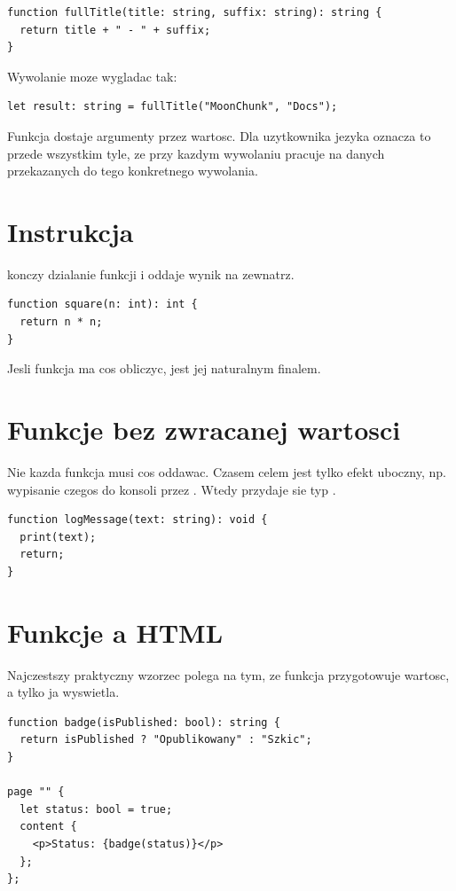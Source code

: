 \begin{lstlisting}[style=moonchunk,caption={Funkcja z dwoma parametrami}]
function fullTitle(title: string, suffix: string): string {
  return title + " - " + suffix;
}
\end{lstlisting}

Wywolanie moze wygladac tak:

\begin{lstlisting}[style=moonchunk,caption={Wywolanie funkcji}]
let result: string = fullTitle("MoonChunk", "Docs");
\end{lstlisting}

Funkcja dostaje argumenty przez wartosc. Dla uzytkownika jezyka oznacza to przede
wszystkim tyle, ze przy kazdym wywolaniu pracuje na danych przekazanych do tego
konkretnego wywolania.

\section{Instrukcja }
 konczy dzialanie funkcji i oddaje wynik na zewnatrz.

\begin{lstlisting}[style=moonchunk,caption={Zwracanie wyniku z funkcji}]
function square(n: int): int {
  return n * n;
}
\end{lstlisting}

Jesli funkcja ma cos obliczyc,  jest jej naturalnym finalem.

\section{Funkcje bez zwracanej wartosci}
Nie kazda funkcja musi cos oddawac. Czasem celem jest tylko efekt uboczny, np. wypisanie
czegos do konsoli przez . Wtedy przydaje sie typ .

\begin{lstlisting}[style=moonchunk,caption={Funkcja typu void}]
function logMessage(text: string): void {
  print(text);
  return;
}
\end{lstlisting}

\section{Funkcje a HTML}
Najczestszy praktyczny wzorzec polega na tym, ze funkcja przygotowuje wartosc,
a  tylko ja wyswietla.

\begin{lstlisting}[style=moonchunk,caption={Funkcja przygotowujaca tekst do strony}]
function badge(isPublished: bool): string {
  return isPublished ? "Opublikowany" : "Szkic";
}

page "" {
  let status: bool = true;
  content {
    <p>Status: {badge(status)}</p>
  };
};
\end{lstlisting}

